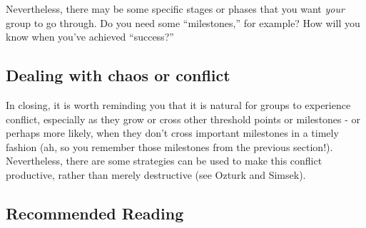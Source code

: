Nevertheless, there may be some specific stages or phases that you want
\emph{your} group to go through. Do you need some ``milestones,'' for
example? How will you know when you've achieved ``success?''

\subsection{Dealing with chaos or conflict}

In closing, it is worth reminding you that it is natural for groups to
experience conflict, especially as they grow or cross other threshold
points or milestones - or perhaps more likely, when they don't cross
important milestones in a timely fashion (ah, so you remember those
milestones from the previous section!). Nevertheless, there are some
strategies can be used to make this conflict productive, rather than
merely destructive (see Ozturk and Simsek).

\subsection{Recommended Reading}

